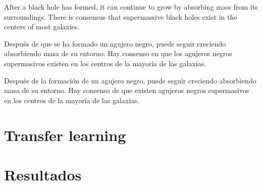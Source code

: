 \begin{spverbatim}
After a black hole has formed, it can continue to grow by absorbing mass from its surroundings. There is consensus that supermassive black holes exist in the centers of most galaxies.
\end{spverbatim}
\begin{spverbatim}
Después de que se ha formado un agujero negro, puede seguir creciendo absorbiendo masa de su entorno. Hay consenso en que los agujeros negros supermasivos existen en los centros de la mayoría de las galaxias.
\end{spverbatim}
\begin{spverbatim}
Después de la formación de un agujero negro, puede seguir creciendo absorbiendo masa de su entorno. Hay consenso de que existen agujeros negros supermasivos en los centros de la mayoría de las galaxias.
\end{spverbatim}



\section{Transfer learning}
\section{Resultados}